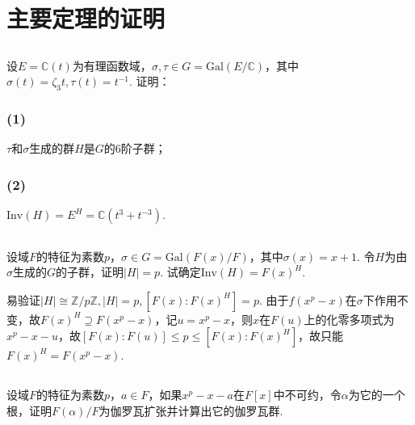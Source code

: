 \section{主要定理的证明}
\subsection{}
设$E=\mathbb{C}(t)$为有理函数域，$\sigma,\tau\in G=\mathrm{Gal}(E/\mathbb{C})$，其中$\sigma(t)=\zeta_3t, \tau(t)=t^{-1}$. 证明：
\subsubsection{(1)}
$\tau$和$\sigma$生成的群$H$是$G$的$6$阶子群；


\subsubsection{(2)}
$\mathrm{Inv}(H)=E^{H}=\mathbb{C}(t^3+t^{-3})$.


\subsection{}
设域$F$的特征为素数$p$，$\sigma\in G=\mathrm{Gal}(F(x)/F)$，其中$\sigma(x)=x+1$. 令$H$为由$\sigma$生成的$G$的子群，证明$|H|=p$. 试确定$\mathrm{Inv}(H)=F(x)^H$.

\jie 易验证$|H|\cong\mathbb{Z}/p\mathbb{Z}, |H|=p, [F(x):F(x)^H]=p$. 由于$f(x^p-x)$在$\sigma$下作用不变，故$F(x)^{H}\supseteq F(x^p-x)$，记$u=x^p-x$，则$x$在$F(u)$上的化零多项式为$x^p-x-u$，故$[F(x):F(u)]\leq p\leq [F(x):F(x)^H]$，故只能$F(x)^H=F(x^p-x)$.

\subsection{}
设域$F$的特征为素数$p$，$a\in F$，如果$x^p-x-a$在$F[x]$中不可约，令$\alpha$为它的一个根，证明$F(\alpha)/F$为伽罗瓦扩张并计算出它的伽罗瓦群.



